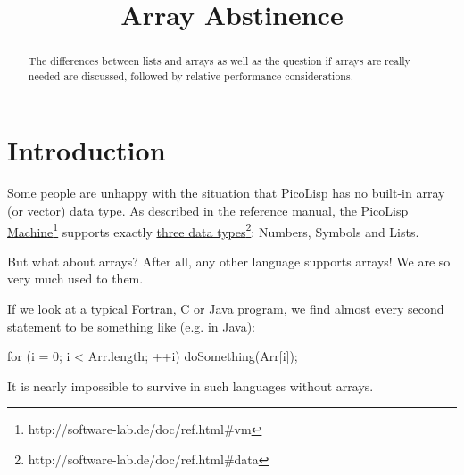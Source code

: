 \title{Array Abstinence}

\maketitle





% 

\begin{abstract}
  The differences between lists and arrays as well as the question if
  arrays are really needed are discussed, followed by relative
  performance considerations. 
\end{abstract}

\section{Introduction}
\label{sec:array-abst-introduction}

Some people are unhappy with the situation that PicoLisp has no
built-in array (or vector) data type. As described in the reference
manual, the \underline{PicoLisp
  Machine}\footnote{http://software-lab.de/doc/ref.html\#vm} supports
exactly \underline{three data
  types}\footnote{http://software-lab.de/doc/ref.html\#data}: Numbers,
Symbols and Lists.

But what about arrays? After all, any other language supports arrays! We are so
very much used to them.

If we look at a typical Fortran, C or Java program, we find almost every second
statement to be something like (e.g. in Java):
\begin{wideverbatim}
   for (i = 0; i < Arr.length; ++i)
      doSomething(Arr[i]);
\end{wideverbatim}

It is nearly impossible to survive in such languages without arrays.

